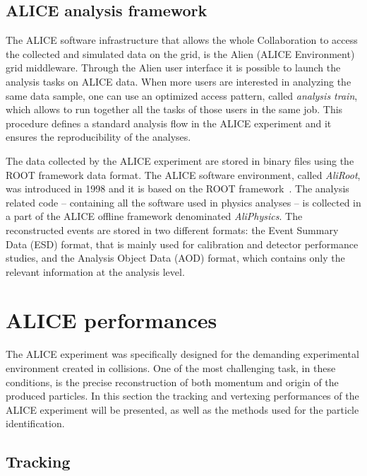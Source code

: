 %
\subsection{ALICE analysis framework} \label{sec:anal_frame}

The ALICE software infrastructure that allows the whole Collaboration to access the collected and
simulated data on the grid, is the Alien (ALICE Environment)~\cite{alien} grid middleware.
Through the Alien user interface it is possible to launch the analysis tasks on ALICE data. 
When more users are interested in analyzing the same data sample, one can use an optimized
access pattern, called \textit{analysis train}, which allows to run together all the tasks
of those users in the same job.
This procedure defines a standard analysis flow in the ALICE experiment and it ensures the
reproducibility of the analyses.

The data collected by the ALICE experiment are stored in binary files using the ROOT framework data 
format.
The ALICE software environment, called \textit{AliRoot}, was introduced in 1998 and it is based on 
the ROOT framework~\cite{root}.
The analysis related code -- containing all the software used in physics analyses -- is collected
in a part of the ALICE offline framework denominated \textit{AliPhysics}.
The reconstructed events are stored in two different formats: the Event Summary Data (ESD) format, 
that is mainly used for calibration and detector performance studies, and the Analysis Object Data 
(AOD) format, which contains only the relevant information at the analysis level.

%
%
\section{ALICE performances} \label{sec:ali_perf}

The ALICE experiment was specifically designed for the demanding experimental environment created in 
\PbPb collisions. 
One of the most challenging task, in these conditions, is the precise reconstruction of both momentum
and origin of the produced particles.
In this section the tracking and vertexing performances of the ALICE experiment will be presented,
as well as the methods used for the particle identification.

%
\subsection{Tracking} \label{sec:tarcking}


